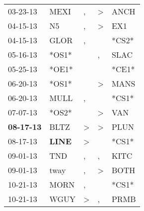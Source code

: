 \begin{supertabular}{p{0.07\textwidth}p{0.06\textwidth}p{0.02\textwidth}p{0.02\textwidth}p{0.06\textwidth}}
          03-23-13\textsuperscript{} &           MEXI\textsuperscript{} &                , &     \textgreater &           ANCH\textsuperscript{} \\
          04-15-13\textsuperscript{} &             N5\textsuperscript{} &                , &     \textgreater &            EX1\textsuperscript{} \\
          04-15-13\textsuperscript{} &           GLOR\textsuperscript{} &                , &                  &                            *CS2* \\
          05-16-13\textsuperscript{} &                            *OS1* &                  &                , &           SLAC\textsuperscript{} \\
          05-25-13\textsuperscript{} &                            *OE1* &                  &                  &                            *CE1* \\
          06-20-13\textsuperscript{} &                            *OS1* &                  &     \textgreater &           MANS\textsuperscript{} \\
          06-20-13\textsuperscript{} &           MULL\textsuperscript{} &                , &                  &                            *CS1* \\
          07-07-13\textsuperscript{} &                            *OS2* &                  &     \textgreater &            VAN\textsuperscript{} \\
 \textbf{08-17-13\textsuperscript{}} &           BLTZ\textsuperscript{} &     \textgreater &     \textgreater &           PLUN\textsuperscript{} \\
          08-17-13\textsuperscript{} &  \textbf{LINE\textsuperscript{}} &     \textgreater &                  &                            *CS1* \\
          09-01-13\textsuperscript{} &            TND\textsuperscript{} &                , &                , &           KITC\textsuperscript{} \\
          09-01-13\textsuperscript{} &           tway\textsuperscript{} &                , &     \textgreater &           BOTH\textsuperscript{} \\
          10-21-13\textsuperscript{} &           MORN\textsuperscript{} &                , &                  &                            *CS1* \\
          10-21-13\textsuperscript{} &           WGUY\textsuperscript{} &     \textgreater &                , &           PRMB\textsuperscript{} \\

\end{supertabular}
